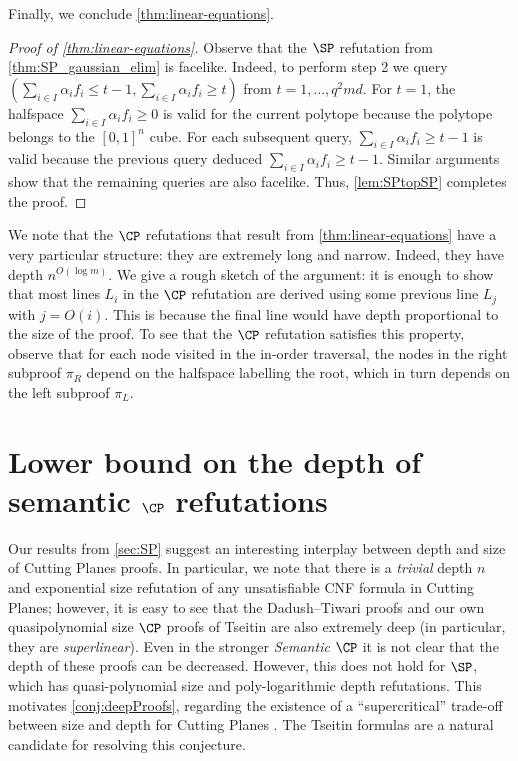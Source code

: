 \documentclass[11pt]{article}
\begin{document}
	
Finally, we conclude \autoref{thm:linear-equations}.

\begin{proof}[Proof of \autoref{thm:linear-equations}]
Observe that the $\SP$ refutation from \autoref{thm:SP_gaussian_elim} is facelike. Indeed, to perform step 2 we query $(\sum_{i \in I} \alpha_i f_i \leq t-1, \sum_{i \in I} \alpha_i f_i \geq t)$ from $t = 1,\ldots, q^2md$. For $t=1$, the halfspace $\sum_{i \in I} \alpha_i f_i \geq 0$ is valid for the current polytope because the polytope belongs to the $[0,1]^n$ cube. For each subsequent query, $\sum_{i \in I} \alpha_i f_i  \geq t-1$ is valid because the previous query deduced $\sum_{i \in I} \alpha_i f_i  \geq t-1$. Similar arguments show that the remaining queries are also facelike. Thus, \autoref{lem:SPtopSP} completes the proof.
\end{proof}

We note that the $\CP$ refutations that result from  \autoref{thm:linear-equations} have a very particular structure: they are extremely long and narrow. 
Indeed, they have depth $n^{O(\log m)}$. 
We give a rough sketch of the argument: it is enough to show that most lines $L_i$ in the $\CP$ refutation are derived using some previous line $L_j$ with $j=O(i)$. %
This is because the final line would have depth proportional to the size of the proof. 
To see that the $\CP$ refutation satisfies this property, observe that for each node visited in the in-order traversal, the nodes in the right subproof $\pi_R$ depend on the halfspace labelling the root, which in turn depends on the left subproof $\pi_L$.









\section{Lower bound on the depth of semantic \texorpdfstring{$\CP$}{CP} refutations}
Our results from \autoref{sec:SP} %
suggest an interesting interplay between depth and size of Cutting Planes proofs.
In particular, we note that there is a \emph{trivial} depth $n$ and exponential size refutation of any unsatisfiable CNF formula in Cutting Planes; however, it is easy to see that the Dadush--Tiwari proofs and our own quasipolynomial size $\CP$ proofs of Tseitin are also extremely deep (in particular, they are \emph{superlinear}). Even in  the stronger \emph{Semantic} $\CP$ it is not clear that the depth of these proofs can be  decreased.
However, this does not hold for $\SP$, which has quasi-polynomial size and poly-logarithmic depth refutations.
This motivates \autoref{conj:deepProofs}, regarding the existence of a ``supercritical'' trade-off between size and depth for Cutting Planes \cite{Razborov16,BerkholzN20}. The Tseitin formulas are a natural candidate for resolving this conjecture. 
\end{document}
